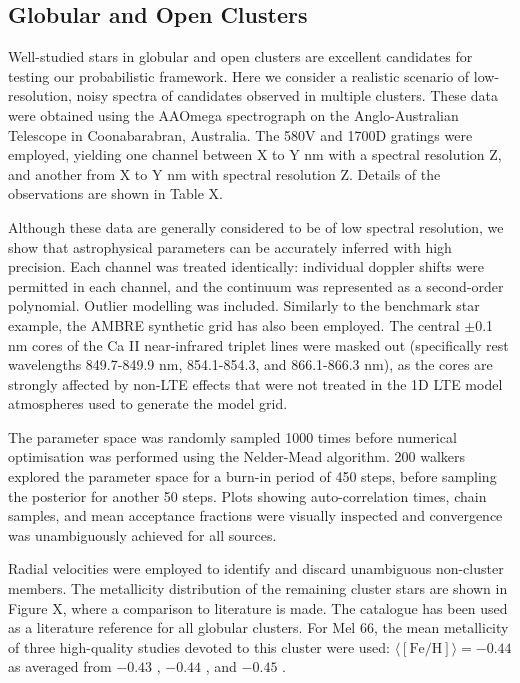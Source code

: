 \documentclass{aastex}
\begin{document}


\subsection{Globular and Open Clusters}
Well-studied stars in globular and open clusters are excellent candidates for testing our probabilistic framework. Here we consider a realistic scenario of low-resolution, noisy spectra of candidates observed in multiple clusters. These data were obtained using the AAOmega spectrograph on the Anglo-Australian Telescope in Coonabarabran, Australia. The 580V and 1700D gratings were employed, yielding one channel between X to Y nm with a spectral resolution Z, and another from X to Y nm with spectral resolution Z. Details of the observations are shown in Table X.


Although these data are generally considered to be of low spectral resolution, we show that astrophysical parameters can be accurately inferred with high precision. Each channel was treated identically: individual doppler shifts were permitted in each channel, and the continuum was represented as a second-order polynomial. Outlier modelling was included. Similarly to the benchmark star example, the AMBRE synthetic grid has also been employed. The central $\pm$0.1 nm cores of the Ca II near-infrared triplet lines were masked out (specifically rest wavelengths 849.7-849.9 nm, 854.1-854.3, and 866.1-866.3 nm), as the cores are strongly affected by non-LTE effects that were not treated in the 1D LTE model atmospheres used to generate the model grid. 

The parameter space was randomly sampled 1000 times before numerical optimisation was performed using the Nelder-Mead algorithm. 200 walkers explored the parameter space for a burn-in period of 450 steps, before sampling the posterior for another 50 steps. Plots showing auto-correlation times, chain samples, and mean acceptance fractions were visually inspected and convergence was unambiguously achieved for all sources.

Radial velocities were employed to identify and discard unambiguous non-cluster members. The metallicity distribution of the remaining cluster stars are shown in Figure X, where a comparison to literature is made. The \citet{harris} catalogue has been used as a literature reference for all globular clusters. For Mel 66, the mean metallicity of three high-quality studies devoted to this cluster were used: $\langle[\mbox{Fe/H}]\rangle = -0.44$ as averaged from $-0.43$ \citep{who}, $-0.44$ \citep{who}, and $-0.45$ \citep{who}.
\end{document}
